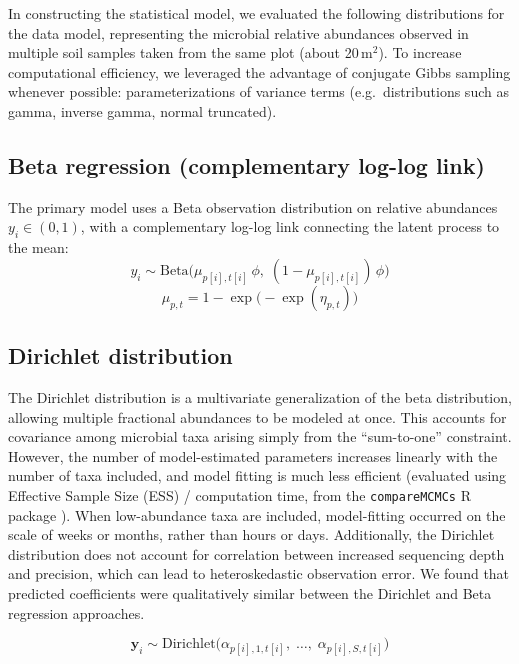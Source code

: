 \documentclass[11pt]{article}
\begin{document}
In constructing the statistical model, we evaluated the following distributions for the data model, representing the microbial relative abundances observed in multiple soil samples taken from the same plot (about 20\,m$^2$). To increase computational efficiency, we leveraged the advantage of conjugate Gibbs sampling whenever possible: parameterizations of variance terms (e.g.\ distributions such as gamma, inverse gamma, normal truncated).

\subsection{Beta regression (complementary log-log link)}

The primary model uses a Beta observation distribution on relative abundances $y_i \in (0,1)$, with a complementary log-log link connecting the latent process to the mean:
\begin{equation}
y_i \sim \mathrm{Beta}\!\bigl(\mu_{p[i],t[i]}\,\phi,\;(1-\mu_{p[i],t[i]})\,\phi\bigr)
\end{equation}
\begin{equation}
\mu_{p,t} = 1 - \exp\!\bigl(-\exp(\eta_{p,t})\bigr)
\end{equation}

\subsection{Dirichlet distribution}

The Dirichlet distribution is a multivariate generalization of the beta distribution, allowing multiple fractional abundances to be modeled at once. This accounts for covariance among microbial taxa arising simply from the ``sum-to-one'' constraint. However, the number of model-estimated parameters increases linearly with the number of taxa included, and model fitting is much less efficient (evaluated using Effective Sample Size (ESS) / computation time, from the \texttt{compareMCMCs} R package \citep{DeValpine2022}). When low-abundance taxa are included, model-fitting occurred on the scale of weeks or months, rather than hours or days. Additionally, the Dirichlet distribution does not account for correlation between increased sequencing depth and precision, which can lead to heteroskedastic observation error. We found that predicted coefficients were qualitatively similar between the Dirichlet and Beta regression approaches.

\begin{equation}
\mathbf{y}_i \sim \mathrm{Dirichlet}\!\bigl(\alpha_{p[i],1,t[i]},\;\dots,\;\alpha_{p[i],S,t[i]}\bigr)
\end{equation}
\end{document}
